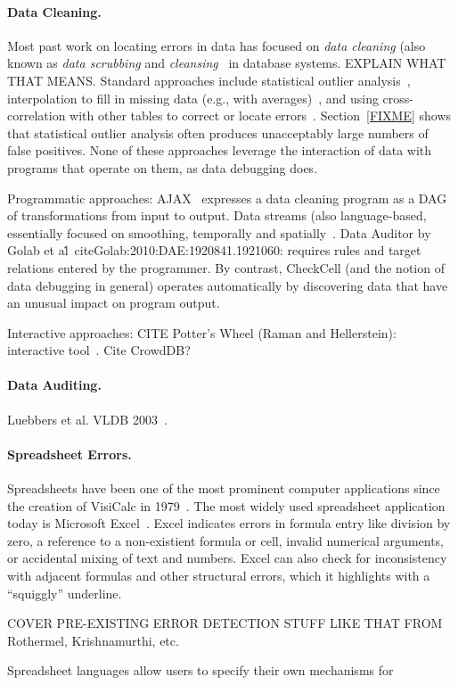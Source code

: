 
\paragraph{Data Cleaning.}
Most past work on locating errors in data has focused on \emph{data
cleaning} (also known as \emph{data scrubbing}
and \emph{cleansing}~\cite{DBLP:journals/debu/RahmD00} in database
systems. EXPLAIN WHAT THAT MEANS. Standard approaches include
statistical outlier analysis~\cite{FIXME}, interpolation to fill in
missing data (e.g., with averages)~\cite{FIXME}, and using
cross-correlation with other tables to correct or locate
errors~\cite{FIXME}. Section~\ref{FIXME} shows that statistical
outlier analysis often produces unacceptably large numbers of false
positives. None of these approaches leverage the interaction of data
with programs that operate on them, as data debugging does.


Programmatic approaches: AJAX~\cite{Galhardas:2000:AED:342009.336568}
expresses a data cleaning program as a DAG of transformations from
input to output. Data streams (also language-based, essentially
focused on smoothing, temporally and spatially~\cite{1617508}. Data
Auditor by Golab et al\.~cite{Golab:2010:DAE:1920841.1921060}:
requires rules and target relations entered by the programmer. By
contrast, CheckCell (and the notion of data debugging in general)
operates automatically by discovering data that have an unusual impact
on program output.

Interactive approaches: CITE Potter's Wheel (Raman and Hellerstein):
interactive tool~\cite{Raman:2001:PWI:645927.672045}. Cite CrowdDB?

\paragraph{Data Auditing.}
Luebbers et al. VLDB 2003~\cite{Luebbers:2003:SDD:1315451.1315499}.

\paragraph{Spreadsheet Errors.}
Spreadsheets have been one of the most prominent computer applications
since the creation of VisiCalc in 1979~\cite{FIXME}. The most widely
used spreadsheet application today is Microsoft Excel~\cite{}. Excel
indicates errors in formula entry like division by zero, a reference
to a non-existient formula or cell, invalid numerical arguments, or
accidental mixing of text and numbers.
Excel can also check for inconsistency with adjacent formulas and other structural errors, which it
highlights with a ``squiggly'' underline.

COVER PRE-EXISTING ERROR DETECTION STUFF LIKE THAT FROM Rothermel, Krishnamurthi, etc.

Spreadsheet languages allow users to specify their own mechanisms for
